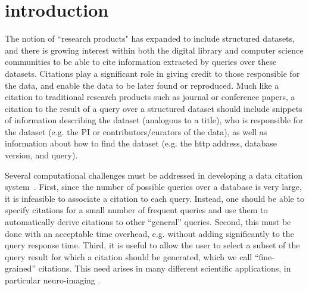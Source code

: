 \section{introduction}\label{Sec: intro}
The notion of  ``research products" has expanded to include structured datasets,
and there is growing interest within both the digital library and computer science communities to be able to cite information extracted by queries over these datasets. Citations play a significant role in giving credit to those responsible for the data, and enable the data to be later found or reproduced. Much like a citation to traditional research products such as journal or conference papers, a citation to the result of a query over a structured dataset should include snippets of information describing the dataset (analogous to a title), who is responsible for the dataset (e.g. the PI or contributors/curators of the data), as well as information about how to find the dataset (e.g. the http address, database version, and query). 

Several computational challenges must be addressed in developing a data citation system~\cite{BunemanEtAl2016}.  First, since the number of possible queries over a database is very large, it is infeasible to associate a citation to each query.  Instead, one should be able to specify citations for a small number of frequent queries and use them to automatically derive citations to other ``general'' queries.  Second, this  must be done with an acceptable time overhead, e.g. without adding significantly to the query response time.  Third, it is useful to allow the user to select a subset of the query result for which a citation should be generated, which we call  ``fine-grained'' citations.  This need  arises in many different scientific applications, in particular neuro-imaging \cite{HonorEtAl2016}. 



